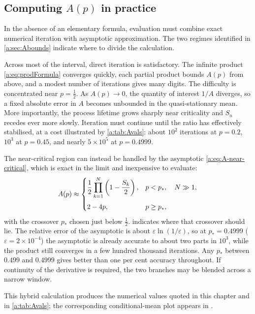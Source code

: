 \subsection{Computing \texorpdfstring{$A(p)$}{A(p)} in practice}
\label{a:sec:practical}

In the absence of an elementary formula, evaluation must combine exact numerical
iteration with asymptotic approximation.  The two regimes identified in
\cref{a:sec:Abounds} indicate where to divide the calculation.

Across most of the interval, direct iteration is satisfactory.  The infinite
product \cref{a:eq:prodFormula} converges quickly, each partial product bounds
$A(p)$ from above, and a modest number of iterations gives many digits.  The
difficulty is concentrated near $p=\tfrac12$.  As $A(p)\to0$, the quantity of
interest $1/A$ diverges, so a fixed absolute error in $A$ becomes unbounded in the
quasi-stationary mean.  More importantly, the process lifetime grows sharply near
criticality and $S_n$ recedes ever more slowly.  Iteration must continue until the
ratio has effectively stabilised, at a cost illustrated by \cref{a:tab:Avals}:
about $10^2$ iterations at $p=0.2$, $10^3$ at $p=0.45$, and nearly
$5\times10^5$ at $p=0.4999$.

The near-critical region can instead be handled by the asymptotic
\cref{a:eq:A-near-critical}, which is exact in the limit and inexpensive to
evaluate:
\begin{equation}
\label{a:eq:Apractical}
A(p) \approx
\begin{cases}
\displaystyle \frac12\prod_{k=1}^{N}\left(1-\frac{S_k}{2}\right), & p<p_\ast,\quad N\gg1,\\[14pt]
2-4p, & p\ge p_\ast,
\end{cases}
\end{equation}
with the crossover $p_\ast$ chosen just below $\tfrac12$.
 indicates where that crossover should lie.  The
relative error of the asymptotic is about
$\varepsilon\ln(1/\varepsilon)$, so at $p_\ast = 0.4999$
($\varepsilon = 2\times10^{-4}$) the asymptotic is already accurate to about two
parts in $10^3$, while the product still converges in a few hundred thousand
iterations.  Any $p_\ast$ between $0.499$ and $0.4999$ gives better than one per
cent accuracy throughout.  If continuity of the derivative is required, the two
branches may be blended across a narrow window.

This hybrid calculation produces the numerical values quoted in this chapter and
in \cref{a:tab:Avals}; the corresponding conditional-mean plot appears in \ChM.

\FloatBarrier
